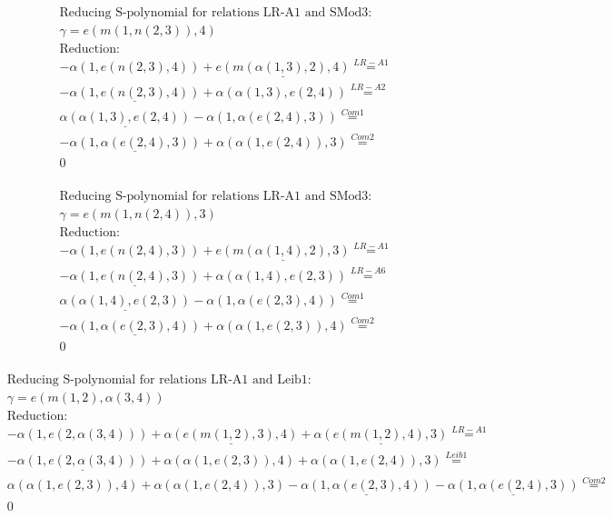 \documentclass[11pt]{amsart}
\begin{document}
\begin{align*} 
& \text{Reducing S-polynomial for relations LR-A1 and SMod3:} \\ 
& \gamma = e(m(1,n(2,3)),4) \\ 
& \text{Reduction}: \\& - \alpha(1,e(n(2,3),4)) + \underline{e(m(\alpha(1,3),2),4)} \stackrel{ LR-A1 }{=}  \\ 
& - \underline{\alpha(1,e(n(2,3),4))} + \alpha(\alpha(1,3),e(2,4)) \stackrel{ LR-A2 }{=}  \\ 
&\underline{\alpha(\alpha(1,3),e(2,4))} - \alpha(1,\alpha(e(2,4),3)) \stackrel{ Com1 }{=}  \\ 
& - \underline{\alpha(1,\alpha(e(2,4),3))} + \alpha(\alpha(1,e(2,4)),3) \stackrel{ Com2 }{=}  \\ 
&0\\ 
\end{align*} 
 
\begin{align*} 
& \text{Reducing S-polynomial for relations LR-A1 and SMod3:} \\ 
& \gamma = e(m(1,n(2,4)),3) \\ 
& \text{Reduction}: \\& - \alpha(1,e(n(2,4),3)) + \underline{e(m(\alpha(1,4),2),3)} \stackrel{ LR-A1 }{=}  \\ 
& - \underline{\alpha(1,e(n(2,4),3))} + \alpha(\alpha(1,4),e(2,3)) \stackrel{ LR-A6 }{=}  \\ 
&\underline{\alpha(\alpha(1,4),e(2,3))} - \alpha(1,\alpha(e(2,3),4)) \stackrel{ Com1 }{=}  \\ 
& - \underline{\alpha(1,\alpha(e(2,3),4))} + \alpha(\alpha(1,e(2,3)),4) \stackrel{ Com2 }{=}  \\ 
&0\\ 
\end{align*} 
 
\begin{align*} 
& \text{Reducing S-polynomial for relations LR-A1 and Leib1:} \\ 
& \gamma = e(m(1,2),\alpha(3,4)) \\ 
& \text{Reduction}: \\& - \alpha(1,e(2,\alpha(3,4))) + \underline{\alpha(e(m(1,2),3),4)} + \underline{\alpha(e(m(1,2),4),3)} \stackrel{ LR-A1 }{=}  \\ 
& - \underline{\alpha(1,e(2,\alpha(3,4)))} + \alpha(\alpha(1,e(2,3)),4) + \alpha(\alpha(1,e(2,4)),3) \stackrel{ Leib1 }{=}  \\ 
&\alpha(\alpha(1,e(2,3)),4) + \alpha(\alpha(1,e(2,4)),3) - \underline{\alpha(1,\alpha(e(2,3),4))} - \underline{\alpha(1,\alpha(e(2,4),3))} \stackrel{ Com2 }{=}  \\ 
&0\\ 
\end{align*} 
 
\end{document}
